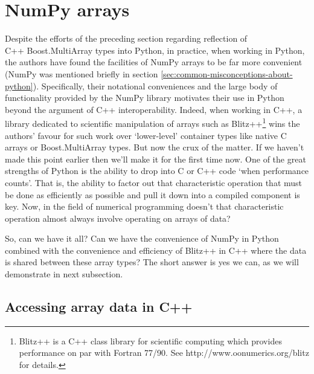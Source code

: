 \section{NumPy arrays}

Despite the efforts of the preceding section regarding reflection of \\
C++ Boost.MultiArray types into Python, in practice, when working in
Python, the authors have found the facilities of NumPy arrays to be
far more convenient (NumPy was mentioned briefly in section
\ref{sec:common-misconceptions-about-python}). Specifically, their
notational conveniences and the large body of functionality provided
by the NumPy library motivates their use in Python beyond the argument
of C++ interoperability. Indeed, when working in C++, a library
dedicated to scientific manipulation of arrays such as
Blitz++\footnote{Blitz++ is a C++ class library for scientific
computing which provides performance on par with Fortran 77/90. See
http://www.oonumerics.org/blitz for details.} wins the authors' favour
for such work over `lower-level' container types like native C arrays
or Boost.MultiArray types. But now the crux of the matter. If we
haven't made this point earlier then we'll make it for the first time
now. One of the great strengths of Python is the ability to drop into
C or C++ code `when performance counts'. That is, the ability to
factor out that characteristic operation that must be done as
efficiently as possible and pull it down into a compiled component is
key. Now, in the field of numerical programming doesn't that characteristic
operation almost always involve operating on arrays of data?

So, can we have it all? Can we have the convenience of NumPy in Python
combined with the convenience and efficiency of Blitz++ in C++ where
the data is shared between these array types? The short answer is yes
we can, as we will demonstrate in next subsection.

\subsection{Accessing array data in C++}

